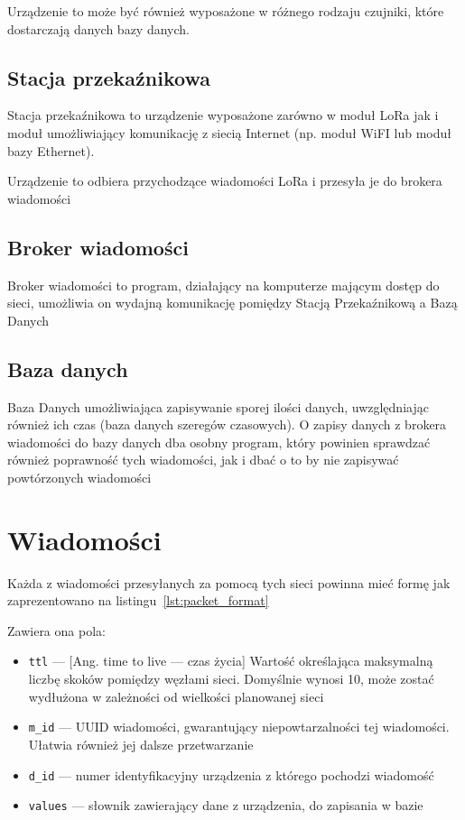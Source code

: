Urządzenie to może być również wyposażone w różnego rodzaju czujniki, które dostarczają danych bazy danych.

\subsection{Stacja przekaźnikowa}
Stacja przekaźnikowa to urządzenie wyposażone zarówno w moduł LoRa jak i moduł umożliwiający komunikację z siecią Internet (np. moduł WiFI lub moduł bazy Ethernet).

Urządzenie to odbiera przychodzące wiadomości LoRa i przesyła je do brokera wiadomości

\subsection{Broker wiadomości}
Broker wiadomości to program, działający na komputerze mającym dostęp do sieci, umożliwia on wydajną komunikację pomiędzy Stacją Przekaźnikową a Bazą Danych

\subsection{Baza danych}
Baza Danych umożliwiająca zapisywanie sporej ilości danych, uwzględniając również ich czas (baza danych szeregów czasowych).
O zapisy danych z brokera wiadomości do bazy danych dba osobny program, który powinien sprawdzać również poprawność tych wiadomości, jak i dbać o to by nie zapisywać powtórzonych wiadomości

\section{Wiadomości}
Każda z wiadomości przesyłanych za pomocą tych sieci powinna mieć formę jak zaprezentowano na listingu~\ref{lst:packet_format}

Zawiera ona pola:
\begin{itemize}
    \item \texttt{ttl} — [Ang. time to live — czas życia] Wartość określająca maksymalną liczbę skoków pomiędzy węzłami sieci. Domyślnie wynosi 10, może zostać wydłużona w zależności od wielkości planowanej sieci
    \item \texttt{m\_id} — UUID \cite{RFC:uuid} wiadomości, gwarantujący niepowtarzalności tej wiadomości. Ułatwia również jej dalsze przetwarzanie
    \item \texttt{d\_id} — numer identyfikacyjny urządzenia z którego pochodzi wiadomość
    \item \texttt{values} — słownik zawierający dane z urządzenia, do zapisania w bazie
\end{itemize}

